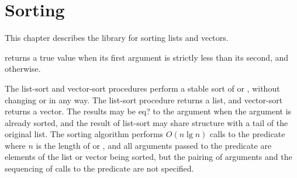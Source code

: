 \chapter{Sorting}
\label{sortingchapter}

This chapter describes the  library for
sorting lists and vectors.

\begin{entry}{%
}

   returns a true value when its first argument
is strictly less than its second, and \schfalse{} otherwise.

The {\cf list-sort} and {\cf vector-sort} procedures perform a stable
sort of  or , without changing  or
 in any way.  The {\cf list-sort} procedure returns a
list, and {\cf vector-sort} returns a vector.  The results may be {\cf
  eq?} to the argument when the argument is already sorted, and the
result of {\cf list-sort} may share structure with a tail of the
original list.  The sorting algorithm performs $O(n \lg n)$ calls to
the predicate where $n$ is the length of  or ,
and all arguments passed to the predicate are elements of the list or
vector being sorted, but the pairing of arguments and the sequencing
of calls to the predicate are not specified.
\end{entry}

